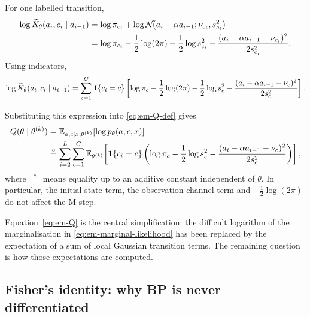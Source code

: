 For one labelled transition,
\begin{align}
  \log
  \widetilde{K}_\theta(a_i,c_i\mid a_{i-1})
  &=
  \log\pi_{c_i}
  +
  \log
  \mathcal{N}\!\big(
    a_i-\alpha a_{i-1};
    \nu_{c_i},s_{c_i}^2
  \big)
  \nonumber\\
  &=
  \log\pi_{c_i}
  -\frac12\log(2\pi)
  -\frac12\log s_{c_i}^2
  -
  \frac{
    (a_i-\alpha a_{i-1}-\nu_{c_i})^2
  }{2s_{c_i}^2}.
  \label{eq:em-single-transition-log}
\end{align}
Using indicators,
\begin{align}
  \log
  \widetilde{K}_\theta(a_i,c_i\mid a_{i-1})
  =
  \sum_{c=1}^{C}
  \mathbf 1\{c_i=c\}
  \left[
    \log\pi_c
    -\frac12\log(2\pi)
    -\frac12\log s_c^2
    -
    \frac{
      (a_i-\alpha a_{i-1}-\nu_c)^2
    }{2s_c^2}
  \right].
  \label{eq:em-indicator-transition}
\end{align}

Substituting this expression into \eqref{eq:em-Q-def} gives
\begin{align}
  Q(\theta\mid\theta^{(k)})
  &=
  \mathbb{E}_{a,c\mid x,\theta^{(k)}}
  \!\left[
    \log p_\theta(a,c,x)
  \right]
  \nonumber\\
  &\overset{c}{=}
  \sum_{i=2}^{L}
  \sum_{c=1}^{C}
  \mathbb{E}_{\theta^{(k)}}\!
  \left[
    \mathbf 1\{c_i=c\}
    \left(
      \log\pi_c
      -\frac12\log s_c^2
      -
      \frac{
        (a_i-\alpha a_{i-1}-\nu_c)^2
      }{2s_c^2}
    \right)
  \right],
  \label{eq:em-Q}
\end{align}
where $\overset{c}{=}$ means equality up to an additive constant independent
of $\theta$. In particular, the initial-state term, the observation-channel
term and $-\frac12\log(2\pi)$ do not affect the M-step.

Equation~\eqref{eq:em-Q} is the central simplification: the difficult
logarithm of the marginalisation in
\eqref{eq:em-marginal-likelihood} has been replaced by the expectation of a
sum of local Gaussian transition terms. The remaining question is how those
expectations are computed.

\subsection{Fisher's identity: why BP is never differentiated}

